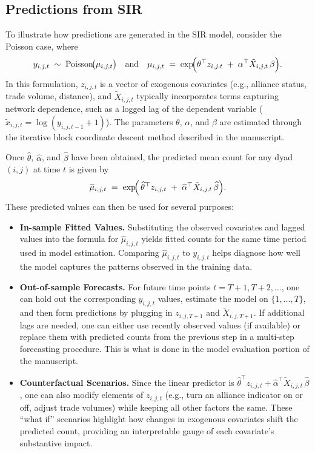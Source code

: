 \clearpage
\subsection*{Predictions from SIR}

To illustrate how predictions are generated in the SIR model, consider the Poisson case, where
\[
y_{i,j,t} \;\sim\; \mathrm{Poisson}\!\bigl(\mu_{i,j,t}\bigr)
\quad\text{and}\quad
\mu_{i,j,t} \;=\; \exp\!\Bigl(\theta^\top z_{i,j,t} \;+\; \alpha^\top \tilde{X}_{i,j,t}\,\beta\Bigr).
\]
In this formulation, \(z_{i,j,t}\) is a vector of exogenous covariates (e.g., alliance status, trade volume, distance), and \(\tilde{X}_{i,j,t}\) typically incorporates terms capturing network dependence, such as a logged lag of the dependent variable (\(\tilde{x}_{i,j,t} = \log(y_{i,j,t-1} + 1)\)). The parameters \(\theta\), \(\alpha\), and \(\beta\) are estimated through the iterative block coordinate descent method described in the manuscript.

Once \(\widehat{\theta}\), \(\widehat{\alpha}\), and \(\widehat{\beta}\) have been obtained, the predicted mean count for any dyad \((i,j)\) at time \(t\) is given by
\[
\widehat{\mu}_{i,j,t} \;=\; \exp\!\Bigl(\,
\widehat{\theta}^\top z_{i,j,t} 
\;+\;\widehat{\alpha}^\top \tilde{X}_{i,j,t}\,\widehat{\beta}
\Bigr).
\]
These predicted values can then be used for several purposes:

\begin{itemize}
	\item \textbf{In-sample Fitted Values.} 
	Substituting the observed covariates and lagged values into the formula for \(\widehat{\mu}_{i,j,t}\) yields fitted counts for the same time period used in model estimation. Comparing \(\widehat{\mu}_{i,j,t}\) to \(y_{i,j,t}\) helps diagnose how well the model captures the patterns observed in the training data.

	\item \textbf{Out-of-sample Forecasts.} 
	For future time points \(t = T+1, T+2, \dots\), one can hold out the corresponding \(y_{i,j,t}\) values, estimate the model on \(\{1, \dots, T\}\), and then form predictions by plugging in \(z_{i,j,T+1}\) and \(\tilde{X}_{i,j,T+1}\). If additional lags are needed, one can either use recently observed values (if available) or replace them with predicted counts from the previous step in a multi-step forecasting procedure. This is what is done in the model evaluation portion of the manuscript.

	\item \textbf{Counterfactual Scenarios.} 
	Since the linear predictor is \(\widehat{\theta}^\top z_{i,j,t} + \widehat{\alpha}^\top \tilde{X}_{i,j,t}\,\widehat{\beta}\), one can also modify elements of \(z_{i,j,t}\) (e.g., turn an alliance indicator on or off, adjust trade volumes) while keeping all other factors the same. These ``what if'' scenarios highlight how changes in exogenous covariates shift the predicted count, providing an interpretable gauge of each covariate's substantive impact.
\end{itemize}


